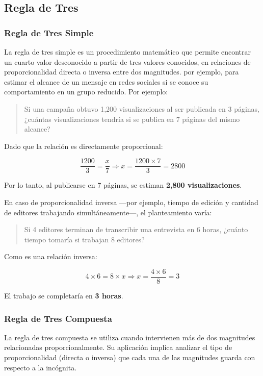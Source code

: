 \documentclass[
  stu,
  floatsintext,
  longtable,
  a4paper,
  nolmodern,
  notxfonts,
  notimes,
  colorlinks=true,linkcolor=blue,citecolor=blue,urlcolor=blue]{apa7}
\begin{document}
\subsection{Regla de Tres}\label{regla-de-tres}

\subsubsection{Regla de Tres Simple}\label{regla-de-tres-simple}

La regla de tres simple es un procedimiento matemático que permite
encontrar un cuarto valor desconocido a partir de tres valores
conocidos, en relaciones de proporcionalidad directa o inversa entre dos
magnitudes. por ejemplo, para estimar el alcance de un mensaje en redes
sociales si se conoce su comportamiento en un grupo reducido. Por
ejemplo:

\begin{quote}
Si una campaña obtuvo 1,200 visualizaciones al ser publicada en 3
páginas, ¿cuántas visualizaciones tendría si se publica en 7 páginas del
mismo alcance?
\end{quote}

Dado que la relación es directamente proporcional:

\[
\frac{1200}{3} = \frac{x}{7} \Rightarrow x = \frac{1200 \times 7}{3} = 2800
\]

Por lo tanto, al publicarse en 7 páginas, se estiman \textbf{2,800
visualizaciones}.

En caso de proporcionalidad inversa ---por ejemplo, tiempo de edición y
cantidad de editores trabajando simultáneamente---, el planteamiento
varía:

\begin{quote}
Si 4 editores terminan de transcribir una entrevista en 6 horas, ¿cuánto
tiempo tomaría si trabajan 8 editores?
\end{quote}

Como es una relación inversa:

\[
4 \times 6 = 8 \times x \Rightarrow x = \frac{4 \times 6}{8} = 3
\]

El trabajo se completaría en \textbf{3 horas}.

\subsubsection{Regla de Tres Compuesta}\label{regla-de-tres-compuesta}

La regla de tres compuesta se utiliza cuando intervienen más de dos
magnitudes relacionadas proporcionalmente. Su aplicación implica
analizar el tipo de proporcionalidad (directa o inversa) que cada una de
las magnitudes guarda con respecto a la incógnita.
\end{document}
